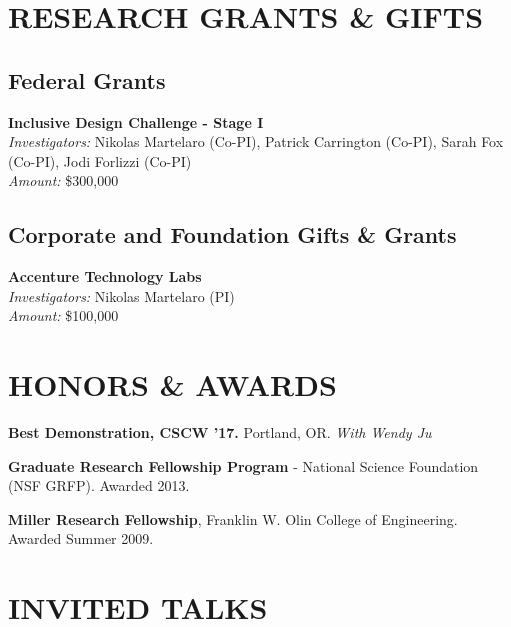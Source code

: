 \documentclass[11pt]{article} %
\begin{document}

\section*{RESEARCH GRANTS \& GIFTS}
\subsection*{Federal Grants}
 \textbf{Inclusive Design Challenge - Stage I}\\
\textit{Investigators:} Nikolas Martelaro (Co-PI), Patrick Carrington (Co-PI), Sarah Fox (Co-PI), Jodi Forlizzi (Co-PI)\\
\textit{Amount:} \$300,000

\subsection*{Corporate and Foundation Gifts \& Grants}
 \textbf{Accenture Technology Labs}\\
\textit{Investigators:} Nikolas Martelaro (PI)\\
\textit{Amount:} \$100,000


\section*{HONORS \& AWARDS}
\textbf{Best Demonstration, CSCW ’17.} Portland, OR. \textit{With Wendy Ju}
\medskip

\textbf{Graduate Research Fellowship Program} - National Science Foundation (NSF GRFP). Awarded 2013.
\medskip

\textbf{Miller Research Fellowship}, Franklin W. Olin College of Engineering. Awarded Summer 2009.


\section*{INVITED TALKS}
\years{}
\end{document}
